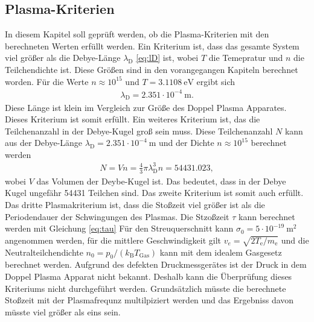 \subsection{Plasma-Kriterien}
In diesem Kapitel soll geprüft werden, ob die Plasma-Kriterien mit den berechneten Werten erfüllt werden. Ein Kriterium ist, dass das gesamte System viel größer als die Debye-Länge $\lambda_{\mathrm{D}}$ \eqref{eq:lD}
ist, wobei $T$ die Temepratur und $n$ die Teilchendichte ist. Diese Größen sind in den vorangegangen Kapiteln berechnet worden. Für die Werte $n \approx 10^{15} $ und $T=3.1108\ \mathrm{eV} $ ergibt sich
\begin{align}
\lambda_{\mathrm{D}} = 2.351 \cdot 10^{-4}\ \mathrm{m}.
\end{align}
Diese Länge ist klein im Vergleich zur Größe des Doppel Plasma Apparates. Dieses Kriterium ist somit erfüllt.  Ein weiteres Kriterium ist, das die Teilchenanzahl in der Debye-Kugel groß sein muss. Diese Teilchenanzahl  $N$ kann aus der Debye-Länge $\lambda_{\mathrm{D}}= 2.351 \cdot 10^{-4}\ \mathrm{m}$ und der Dichte $n \approx 10^{15}$ berechnet werden
\begin{align}
N = V n= \frac{4}{3}\pi \lambda_{\mathrm{D}}^3 n = 54431.023 ,
\end{align}
wobei $V$ das Volumen der Deybe-Kugel ist. Das bedeutet, dass in der Debye Kugel ungefähr 54431 Teilchen sind. Das zweite Kriterium ist somit auch erfüllt. Das dritte Plasmakriterium ist, dass die Stoßzeit viel größer ist als die Periodendauer der Schwingungen des Plasmas. Die Stzoßzeit $\tau$ kann berechnet werden mit
Gleichung \eqref{eq:tau}
Für den Streuquerschnitt kann $\sigma_0= 5 \cdot 10^{-19}\ \mathrm{m}^2 $ angenommen werden, für die mittlere Geschwindigkeit gilt $v_e= \sqrt{2 T_{\mathrm{e}}/m_{\mathrm{e}}} $ und die Neutralteilchendichte $n_0=p_0/(k_{\mathrm{B}}T_{\mathrm{Gas}})$ kann mit dem idealem Gasgesetz berechnet werden. Aufgrund des defekten Druckmessgerätes ist der Druck in dem Doppel Plasma Apparat nicht bekannt. Deshalb kann die Überprüfung dieses Kriteriums nicht durchgeführt werden. Grundsätzlich müsste die berechnete Stoßzeit mit der Plasmafrequnz multilpiziert werden und das Ergebniss davon müsste viel größer als eins sein. 

